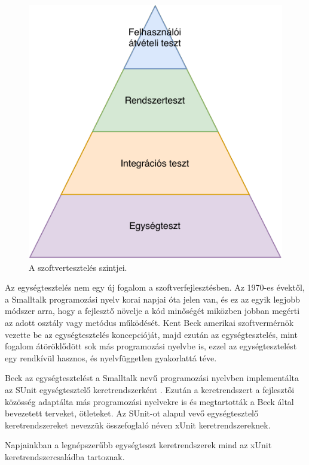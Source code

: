 \begin{figure}[h]
    \centering
    \includegraphics{images/software_testing_levels.pdf}
    \caption{A szoftvertesztelés szintjei.}
    \label{fig:software_testing_levels}
\end{figure}

Az egységtesztelés nem egy új fogalom a szoftverfejlesztésben. Az 1970-es évektől, a Smalltalk programozási nyelv korai napjai óta jelen van, és ez az egyik legjobb módszer arra, hogy a fejlesztő növelje a kód minőségét miközben jobban megérti az adott osztály vagy metódus működését. Kent Beck amerikai szoftvermérnök vezette be az egységtesztelés koncepcióját, majd ezután az egységtesztelés, mint fogalom átöröklődött sok más programozási nyelvbe is, ezzel az egységtesztelést egy rendkívül hasznos, és nyelvfüggetlen gyakorlattá téve. \cite{osherove_2013_the-art-of-unit-testing}

Beck az egységtesztelést a Smalltalk nevű programozási nyelvben implementálta az SUnit egységtesztelő keretrendszerként \cite{beck_1999_guide-to-better-smalltalk}. Ezután a keretrendszert a fejlesztői közösség adaptálta más programozási nyelvekre is és megtartották a Beck által bevezetett terveket, ötleteket. Az SUnit-ot alapul vevő egységtesztelő keretrendszereket nevezzük összefoglaló néven xUnit keretrendszereknek. \cite{fowler_2006_xunit}

Napjainkban a legnépszerűbb egységteszt keretrendszerek mind az xUnit keretrendszercsaládba tartoznak.

